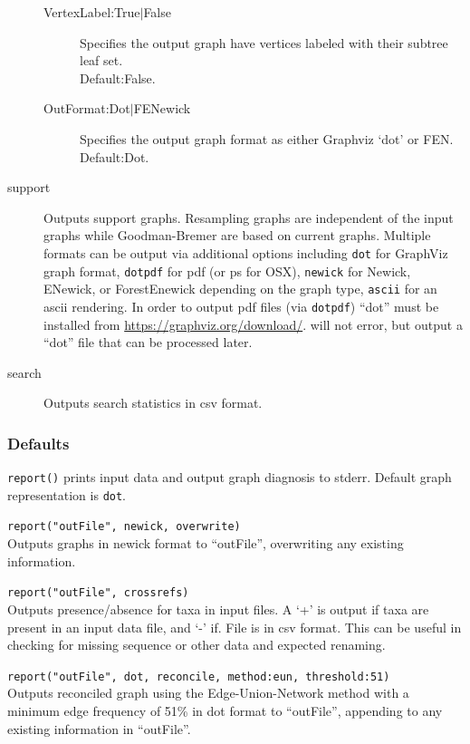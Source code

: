 \begin{description}
\begin{description}
			\item [VertexLabel:True$\mid$False] Specifies the output graph have vertices 
			labeled with their subtree leaf set.\\
			Default:False.
	
			\item [OutFormat:Dot$\mid$FENewick] Specifies the output graph format 
			as either Graphviz `dot' or FEN. \\ 
			Default:Dot.
			\end{description}	
				
		\item[support] Outputs support graphs. Resampling graphs are independent of the 
		input graphs while Goodman-Bremer are based on current graphs. Multiple formats 
		can be output via additional options including \texttt{dot} for GraphViz graph format, 
		\texttt{dotpdf} for pdf (or ps for OSX), \texttt{newick} for Newick, ENewick, or 
		ForestEnewick depending on the graph type, \texttt{ascii} for an ascii rendering. 
		In order to output pdf files (via \texttt{dotpdf}) ``dot'' must be installed from 
		\url{https://graphviz.org/download/}. \phyg will not error, but output a ``dot'' file that 
		can be processed later.
		
		\item[search] Outputs search statistics in csv format.
		 
	\end{description}			
		
	\subsubsection{Defaults}
		\texttt{report()} prints input data and output graph diagnosis to stderr. Default graph 
		representation is \texttt{dot}.
		
	\begin{example}
		\item{\texttt{report("outFile", newick, overwrite)}\\ Outputs graphs in newick format to 
		``outFile'', overwriting any existing information.}
		
		\item{\texttt{report("outFile", crossrefs)}\\ Outputs presence/absence for taxa in input files. 
		A `+' is output if taxa are present in an input data file, and `-' if. File is in csv format. This 
		can be useful in checking for missing sequence or other data and expected renaming.}
		
		\item{\texttt{report("outFile", dot, reconcile, method:eun, threshold:51)}\\ Outputs reconciled 
		graph using the Edge-Union-Network method with a minimum edge frequency of 51\% in 
		dot format to ``outFile'', appending to any existing information in ``outFile''.}
	\end{example}

